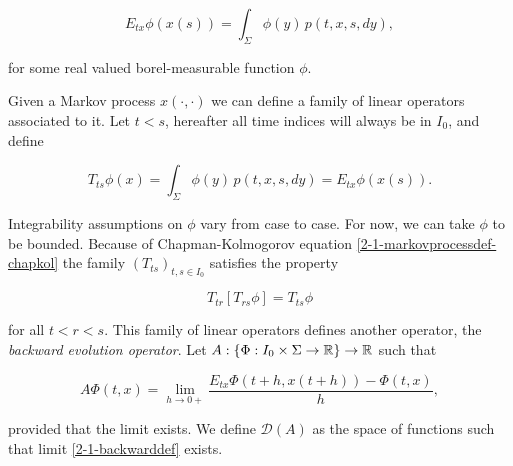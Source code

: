 \begin{equation}
    E_{tx}\phi(x(s)) = \int_{\Sigma} \phi(y)\,p(t,x,s,dy), 
\end{equation}

for some real valued borel-measurable function $\phi$. 

Given a Markov process $x(\cdot, \cdot)$ we can define a family of linear operators associated to it. Let $t<s$, hereafter all time indices will always be in $I_0$, and define

\begin{equation}
    T_{ts}\phi(x) = \int_{\Sigma} \phi(y)\,p(t,x,s,dy) = E_{tx}\phi(x(s)).
\end{equation}

Integrability assumptions on $\phi$ vary from case to case. For now, we can take $\phi$ to be bounded. 
Because of Chapman-Kolmogorov equation \eqref{2-1-markovprocessdef-chapkol} the family $(T_{ts})_{t,s\in I_0}$ 
satisfies the property

\begin{equation}\label{2-1-propT}
    T_{tr}\left[T_{rs}\phi\right] = T_{ts}\phi
\end{equation}

for all $t<r<s$. This family of linear operators defines another operator, the \textit{backward evolution operator}.
Let $A:\left\{\Phi:I_0\times\Sigma\rightarrow\mathbb{R}\right\}\rightarrow \mathbb{R}$ such that

\begin{equation}\label{2-1-backwarddef}
    A\Phi(t,x) = \lim_{h\to0+} \frac{E_{tx}\Phi(t+h,x(t+h))-\Phi(t,x)}{h},
\end{equation}

provided that the limit exists. We define $\mathcal{D}(A)$ as the space of functions such that limit \eqref{2-1-backwarddef} exists. 

